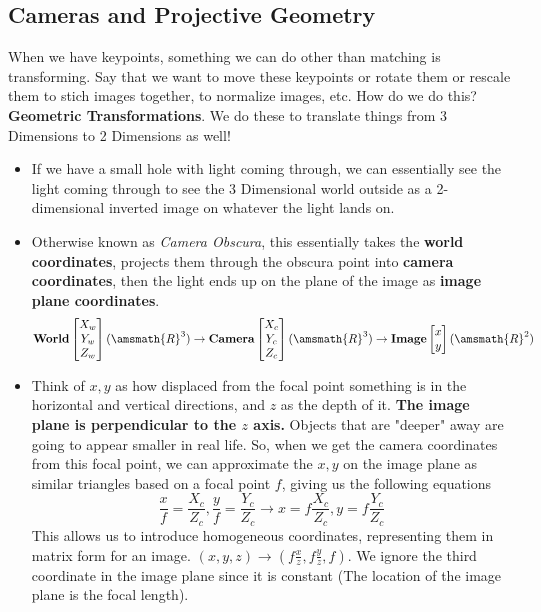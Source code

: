 \documentclass{article}
\begin{document}
\subsection{Cameras and Projective Geometry}
When we have keypoints, something we can do other than matching is transforming. Say that we want to move these keypoints or rotate them or rescale them to stich images together, to normalize images, etc. How do we do this? \textbf{Geometric Transformations}. We do these to translate things from 3 Dimensions to 2 Dimensions as well!
\begin{itemize}
    \item If we have a small hole with light coming through, we can essentially see the light coming through to see the 3 Dimensional world outside as a 2-dimensional inverted image on whatever the light lands on.
    \item Otherwise known as \textit{Camera Obscura}, this essentially takes the \textbf{world coordinates}, projects them through the obscura point into \textbf{camera coordinates}, then the light ends up on the plane of the image as \textbf{image plane coordinates}.
    $$\textbf{World}\begin{bmatrix}
    X_w\\Y_w\\Z_w
    \end{bmatrix}(\amsmath{R}^3) \rightarrow \textbf{Camera}\begin{bmatrix}
    X_c\\Y_c\\Z_c
    \end{bmatrix}(\amsmath{R}^3) \rightarrow \textbf{Image}\begin{bmatrix}
    x\\y
    \end{bmatrix}(\amsmath{R}^2)$$
    \item Think of $x,y$ as how displaced from the focal point something is in the horizontal and vertical directions, and $z$ as the depth of it. \textbf{The image plane is perpendicular to the $z$ axis.} Objects that are "deeper" away are going to appear smaller in real life. So, when we get the camera coordinates from this focal point, we can approximate the $x,y$ on the image plane as similar triangles based on a focal point $f$, giving us the following equations
    $$\frac{x}{f} = \frac{X_c}{Z_c},\frac{y}{f} = \frac{Y_c}{Z_c} \rightarrow x = f\frac{X_c}{Z_c}, y = f\frac{Y_c}{Z_c}$$
    This allows us to introduce homogeneous coordinates, representing them in matrix form for an image. $(x,y,z) \rightarrow (f\frac{x}{z},f\frac{y}{z},f)$. We ignore the third coordinate in the image plane since it is constant (The location of the image plane is the focal length).

\end{itemize}
\end{document}
